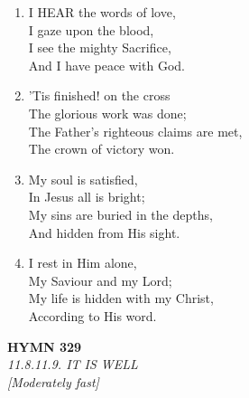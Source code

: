 \begin{enumerate}
    \item I HEAR the words of love, \\
        I gaze upon the blood, \\
        I see the mighty Sacrifice, \\
        And I have peace with God.

    \item 'Tis finished! on the cross \\
        The glorious work was done; \\
        The Father's righteous claims are met, \\
        The crown of victory won.

    \item My soul is satisfied, \\
        In Jesus all is bright; \\
        My sins are buried in the depths, \\
        And hidden from His sight.

    \item I rest in Him alone, \\
        My Saviour and my Lord; \\
        My life is hidden with my Christ, \\
        According to His word.

\end{enumerate}

\newpage
\begin{center}
    {\Large \textbf{HYMN 329}}
    \\
    \textit{11.8.11.9. IT IS WELL}
    \\
    \textit{\small [Moderately fast]}
\end{center}
\vspace{1em}

